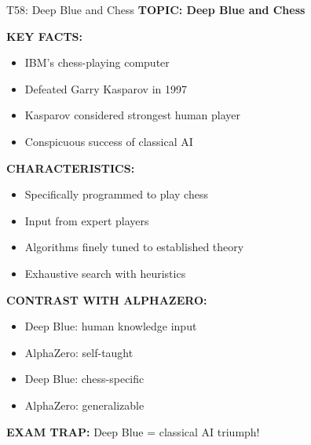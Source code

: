 \documentclass[8pt]{beamer}
\begin{document}
	\begin{frame}{T58: Deep Blue and Chess}
		\fontsize{6.5}{7.5}\selectfont
		\textbf{TOPIC: Deep Blue and Chess}
		
		\vspace{0.1cm}
		\textbf{KEY FACTS:}
		\begin{itemize}
			\item IBM's chess-playing computer
			\item Defeated Garry Kasparov in 1997
			\item Kasparov considered strongest human player
			\item Conspicuous success of classical AI
		\end{itemize}
		
		\vspace{0.1cm}
		\textbf{CHARACTERISTICS:}
		\begin{itemize}
			\item Specifically programmed to play chess
			\item Input from expert players
			\item Algorithms finely tuned to established theory
			\item Exhaustive search with heuristics
		\end{itemize}
		
		\vspace{0.1cm}
		\textbf{CONTRAST WITH ALPHAZERO:}
		\begin{itemize}
			\item Deep Blue: human knowledge input
			\item AlphaZero: self-taught
			\item Deep Blue: chess-specific
			\item AlphaZero: generalizable
		\end{itemize}
		
		\textcolor{myred}{\textbf{EXAM TRAP:}} Deep Blue = \textcolor{myblue}{classical AI triumph}!
	\end{frame}
	
\end{document}
